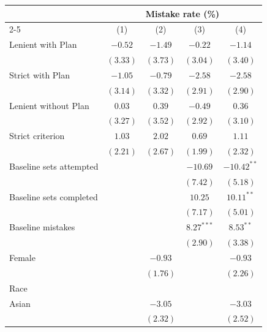 \begin{tabular}{l c c c c}
\toprule
 & \multicolumn{4}{c}{Mistake rate (\%)} \\
\cmidrule(lr){2-5}
 & (1) & (2) & (3) & (4) \\
\midrule
Lenient with Plan        & $-0.52$     & $-1.49$     & $-0.22$      & $-1.14$       \\
                         & $(3.33)$    & $(3.73)$    & $(3.04)$     & $(3.40)$      \\
Strict with Plan         & $-1.05$     & $-0.79$     & $-2.58$      & $-2.58$       \\
                         & $(3.14)$    & $(3.32)$    & $(2.91)$     & $(2.90)$      \\
Lenient without Plan     & $0.03$      & $0.39$      & $-0.49$      & $0.36$        \\
                         & $(3.27)$    & $(3.52)$    & $(2.92)$     & $(3.10)$      \\
Strict criterion         & $1.03$      & $2.02$      & $0.69$       & $1.11$        \\
                         & $(2.21)$    & $(2.67)$    & $(1.99)$     & $(2.32)$      \\
Baseline sets attempted  &             &             & $-10.69$     & $-10.42^{**}$ \\
                         &             &             & $(7.42)$     & $(5.18)$      \\
Baseline sets completed  &             &             & $10.25$      & $10.11^{**}$  \\
                         &             &             & $(7.17)$     & $(5.01)$      \\
Baseline mistakes        &             &             & $8.27^{***}$ & $8.53^{**}$   \\
                         &             &             & $(2.90)$     & $(3.38)$      \\
Female                   &             & $-0.93$     &              & $-0.93$       \\
                         &             & $(1.76)$    &              & $(2.26)$      \\
Race                     &             &             &              &               \\
\quad Asian              &             & $-3.05$     &              & $-3.03$       \\
                         &             & $(2.32)$    &              & $(2.52)$      \\

\end{tabular}
